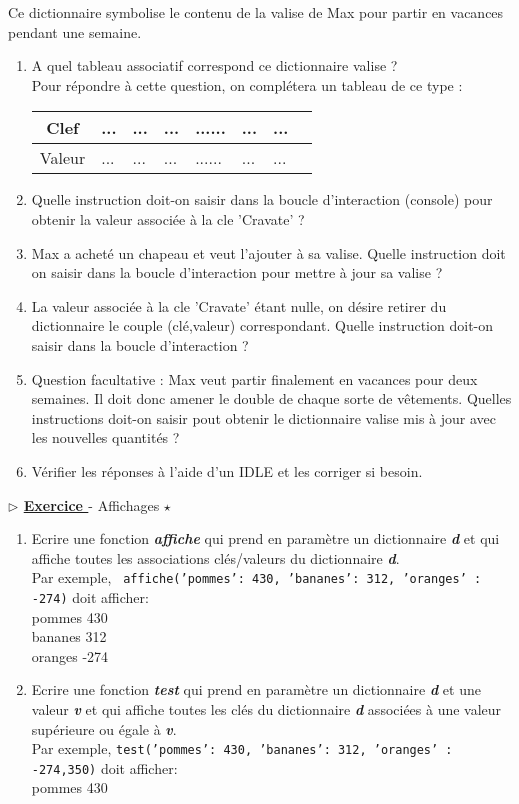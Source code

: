 \documentclass[12pt,french]{article}
\newcounter{npb}
\newcommand{\exo}{
    \stepcounter{npb}
    {\textbf{$\triangleright$ \underline{Exercice \arabic{npb} }}}
}
\begin{document}
Ce dictionnaire symbolise le contenu de la valise de Max pour partir en vacances pendant une semaine.
\begin{enumerate}
	\item A quel tableau associatif correspond ce  dictionnaire valise ? \\
	Pour répondre à cette question, on complétera un tableau de ce type :\\
	\begin{tabular}{|c|p{1cm}|p{1cm}|p{1cm}|p{1cm}|p{1cm}|p{1cm}|p{1cm}|}
	\hline
	Clef&...&...&...&......&...&...\\
	\hline
	Valeur&...&...&...&......&...&...\\
	\hline
	\end{tabular}
	\item Quelle instruction doit-on saisir dans la boucle d'interaction (console) pour obtenir la valeur associée à la cle 'Cravate' ?
	\item Max a acheté un chapeau et veut l'ajouter à sa valise. Quelle instruction doit on saisir dans la boucle d'interaction pour mettre à jour sa valise ? 
	\item La valeur associée à la cle 'Cravate' étant nulle, on désire retirer du dictionnaire le couple (clé,valeur) correspondant. Quelle instruction doit-on saisir dans la boucle d'interaction ?
	\item Question facultative : Max veut partir finalement en vacances pour deux semaines. Il doit donc amener le double de chaque sorte de vêtements. Quelles instructions doit-on saisir pout obtenir le dictionnaire valise mis à jour avec les nouvelles quantités ? 
	\item Vérifier les réponses à l'aide d'un IDLE et les corriger si besoin. 
\end{enumerate}
\exo - Affichages $\star$
\begin{enumerate}
	\item Ecrire une fonction \textbf{\textsl{affiche}} qui prend en paramètre un dictionnaire \textbf{\textsl{d}} et qui affiche toutes les associations clés/valeurs du dictionnaire \textbf{\textsl{d}}.\\
Par exemple,  \texttt{ affiche({'pommes': 430, 'bananes': 312, 'oranges' : -274})}
 doit afficher:\\
pommes 430\\
bananes 312\\
oranges -274
\item Ecrire une fonction \textbf{\textsl{test}} qui prend en paramètre un dictionnaire \textbf{\textsl{d}} et une valeur \textbf{\textsl{v}}  et qui affiche toutes les clés du dictionnaire \textbf{\textsl{d}} associées à une valeur supérieure ou égale à \textbf{\textsl{v}}.\\
Par exemple,  \texttt{test({'pommes': 430, 'bananes': 312, 'oranges' : -274},350)}
doit afficher:\\
pommes 430
\end{enumerate}
\end{document}
